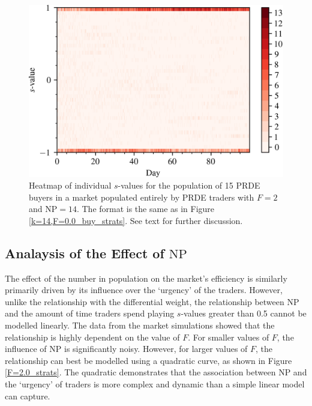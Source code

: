 \documentclass[conference]{IEEEtran}
\begin{document}
\begin{figure}[htbp]
    \centerline{\includegraphics[width=\columnwidth]{k=14,F=2.0_buy_strats.png}}
    \caption{
        Heatmap of individual $s$-values for the population of 15 PRDE buyers in a market populated entirely by PRDE traders with $F=2$ and $\mathrm{NP}=14$.
        The format is the same as in Figure \ref{k=14,F=0.0_buy_strats}.
        See text for further discussion.
    }
    \label{k=14,F=2.0_buy_strats}
\end{figure}

\subsection{Analaysis of the Effect of $\mathrm{NP}$}

The effect of the number in population on the market's efficiency is similarly primarily driven by its influence over the `urgency' of the traders.
However, unlike the relationship with the differential weight, the relationship between $\mathrm{NP}$ and the amount of time traders spend playing $s$-values greater than 0.5 cannot be modelled linearly.
The data from the market simulations showed that the relationship is highly dependent on the value of $F$.
For smaller values of $F$, the influence of $\mathrm{NP}$ is significantly noisy.
However, for larger values of $F$, the relationship can best be modelled using a quadratic curve, as shown in Figure  \ref{F=2.0_strats}.
The quadratic demonstrates that the association between $\mathrm{NP}$ and the `urgency' of traders is more complex and dynamic than a simple linear model can capture.
\end{document}
